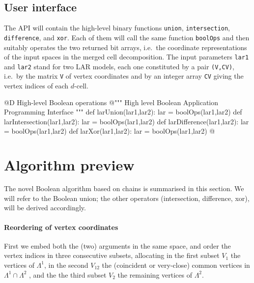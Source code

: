 \documentclass[11pt,oneside]{article}	%
\begin{document}
\subsection{User interface}

The API will contain the high-level binary functions \texttt{union}, \texttt{intersection}, \texttt{difference}, and \texttt{xor}. Each of them will call the same function \texttt{boolOps} and then suitably operates the two returned bit arrays, i.e.~the coordinate representations of the input spaces in the merged cell decomposition. The input parameters \texttt{lar1} and  \texttt{lar2} stand for two LAR models, each one constituted by a pair \texttt{(V,CV)}, i.e.~by the matrix \texttt{V} of vertex coordinates and by an integer array \texttt{CV} giving the vertex indices of each $d$-cell.

@D High-level Boolean operations
@{""" High level Boolean Application Programming Interface """
def larUnion(lar1,lar2): lar = boolOps(lar1,lar2)
def larIntersection(lar1,lar2): lar = boolOps(lar1,lar2)
def larDifference(lar1,lar2): lar = boolOps(lar1,lar2)
def larXor(lar1,lar2): lar = boolOps(lar1,lar2)
@}


\section{Algorithm preview}

The novel Boolean algorithm based on chains is summarised in this section. We will refer to the Boolean union; the other operators (intersection, difference, xor), will be derived accordingly.

\paragraph{Reordering of vertex coordinates}
First we embed both the (two) arguments in the same space, and order the vertex indices in three consecutive subsets, allocating in the first subset $V_1$ the vertices of $\Lambda^1$, in the second $V_{12}$ the (coincident or very-close) common vertices in $\Lambda^1\cap\Lambda^2$ , and the the third subset $V_2$ the remaining vertices of $\Lambda^2$. 
\end{document}
